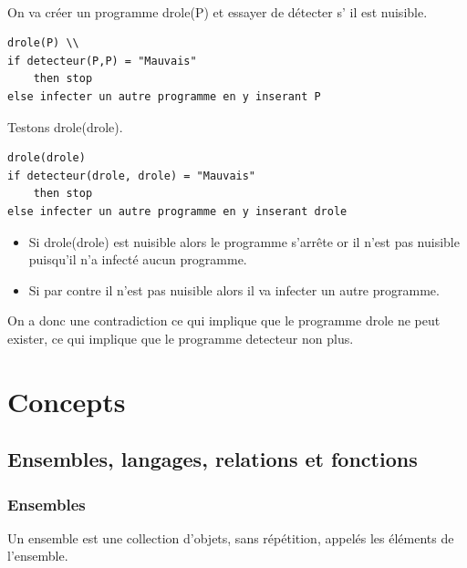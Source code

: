 \paragraph{}On va créer un programme drole(P) et essayer de détecter s’ il est nuisible.

\begin{lstlisting}
drole(P) \\
if detecteur(P,P) = "Mauvais" 
	then stop
else infecter un autre programme en y inserant P
\end{lstlisting}

Testons drole(drole).
\begin{lstlisting}
drole(drole)
if detecteur(drole, drole) = "Mauvais" 
	then stop
else infecter un autre programme en y inserant drole

\end{lstlisting}

\begin{itemize}
	\item Si drole(drole) est nuisible alors le programme s'arrête or il
	       	n'est pas nuisible puisqu'il n'a infecté aucun programme.
	\item Si par contre il n'est pas nuisible alors il va infecter un 
		autre programme.
\end{itemize}
On a donc une contradiction ce qui implique que le programme drole ne peut 
exister, ce qui implique que  le programme detecteur non plus.


\section{Concepts}
\label{sec:concepts}


\subsection{Ensembles, langages, relations et fonctions}
\label{sub:ensembles_langages_relations_et_fonctions}

\subsubsection{Ensembles}
\label{ssub:ensembles}
Un ensemble est une collection d'objets, sans répétition, appelés les éléments
de l'ensemble.\\

